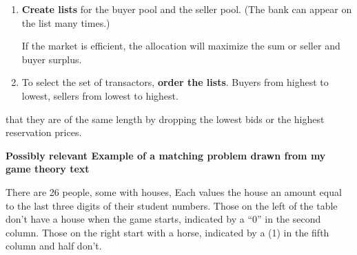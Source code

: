 \begin{enumerate}
\item \textbf{Create lists} for the buyer pool and the seller pool. (The bank can appear on the list many times.) 

If the market is efficient, the allocation will maximize the sum or seller and buyer surplus.

\item To select the set of transactors, \textbf{order the lists}. Buyers from highest to lowest, sellers from lowest to highest.

\end{enumerate}


that they are of the same length by dropping the lowest bids or the highest reservation prices. 

\newpage
\textbf{Possibly relevant Example of a matching problem drawn from my game theory text}

There are 26  people, some with houses, Each values the house an amount equal to the last three digits of their student numbers. Those on the left of the table don't have a house when the game starts, indicated by a ``0'' in the second column. Those on the right  start with a horse, indicated by a  (1) in the fifth column and half don't. 

